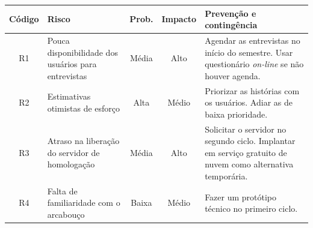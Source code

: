 \begin{quadro}[htbp]
  \centering
  \caption{Riscos do projeto e ações de prevenção e contingência}
  \label{qua:riscos}
  \small
  \begin{tabularx}{\textwidth}{|c|>{\raggedright\arraybackslash}X|c|c|>{\raggedright\arraybackslash}X|}
    \hline
    \textbf{Código} & \textbf{Risco} & \textbf{Prob.} & \textbf{Impacto} &
      \textbf{Prevenção e contingência} \\
    \hline
    R1 & Pouca disponibilidade dos usuários para entrevistas & Média & Alto &
      Agendar as entrevistas no início do semestre. Usar questionário
      \emph{on-line} se não houver agenda. \\
    \hline
    R2 & Estimativas otimistas de esforço & Alta & Médio &
      Priorizar as histórias com os usuários. Adiar as de baixa prioridade. \\
    \hline
    R3 & Atraso na liberação do servidor de homologação & Média & Alto &
      Solicitar o servidor no segundo ciclo. Implantar em serviço gratuito de
      nuvem como alternativa temporária. \\
    \hline
    R4 & Falta de familiaridade com o arcabouço & Baixa & Médio &
      Fazer um protótipo técnico no primeiro ciclo. \\
    \hline
  \end{tabularx}
  \fonteautor
\end{quadro}
